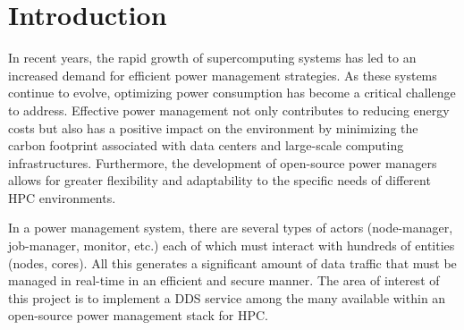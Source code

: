 

\section{Introduction}



In recent years, the rapid growth of supercomputing systems has led to an increased demand for efficient power management strategies. As these systems continue to evolve, optimizing power consumption has become a critical challenge to address. Effective power management not only contributes to reducing energy costs but also has a positive impact on the environment by minimizing the carbon footprint associated with data centers and large-scale computing infrastructures. Furthermore, the development of open-source power managers allows for greater flexibility and adaptability to the specific needs of different HPC environments.

In a power management system, there are several types of actors (node-manager, job-manager, monitor, etc.) each of which must interact with hundreds of entities (nodes, cores). All this generates a significant amount of data traffic that must be managed in real-time in an efficient and secure manner. The area of interest of this project is to implement a DDS service among the many available within an open-source power management stack for HPC.

